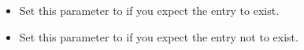 
\begin{itemize}
\item Set this parameter to  if you expect the entry to exist.
\item Set this parameter to  if you expect the entry not to exist.
\end{itemize}
